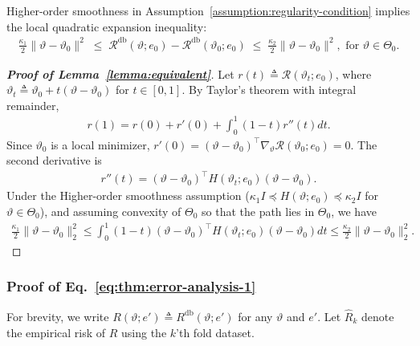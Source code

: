 \begin{lemma}\label{lemma:equivalent}
    \normalfont 
    Higher-order smoothness in Assumption~\ref{assumption:regularity-condition} implies the local quadratic expansion inequality: 
    \begin{align}\label{eq:local-quadratic}
        \frac{\kappa_1}{2}\|\vartheta-\vartheta_0\|^2  \;\le\; \mathcal R^{\mathrm{db}}(\vartheta;e_0)-\mathcal R^{\mathrm{db}}(\vartheta_0;e_0) \;\le\; \frac{\kappa_2}{2}\|\vartheta-\vartheta_0\|^2, \text{ for } \vartheta \in \varTheta_0.
    \end{align}
\end{lemma}
\begin{proof}[\textbf{Proof of Lemma~\ref{lemma:equivalent}}]
    Let $r(t) \triangleq \mathcal{R}(\vartheta_t; e_0)$, where $\vartheta_t \triangleq \vartheta_0 + t(\vartheta - \vartheta_0)$ for $t \in [0,1]$. By Taylor's theorem with integral remainder,
    \begin{align}
        r(1) = r(0) + r'(0) + \int_{0}^{1}(1-t) r''(t) dt.
    \end{align}
    Since $\vartheta_0$ is a local minimizer, $r'(0) = (\vartheta- \vartheta_0)^{\intercal}\nabla_{\vartheta}\mathcal{R}(\vartheta_0; e_0) = 0$. The second derivative is
    \begin{align}
        r''(t) = (\vartheta- \vartheta_0)^{\intercal} H(\vartheta_t; e_0) (\vartheta- \vartheta_0).
    \end{align}
    Under the Higher-order smoothness assumption ($\kappa_1 I \preceq H(\vartheta; e_0) \preceq \kappa_2 I$ for $\vartheta \in \varTheta_0$), and assuming convexity of $\varTheta_0$ so that the path lies in $\varTheta_0$, we have
    \begin{align}
       \frac{\kappa_1}{2} \|\vartheta - \vartheta_0 \|^2_2 \leq \int_{0}^{1}(1-t) (\vartheta - \vartheta_0)^{\intercal} H(\vartheta_t; e_0) (\vartheta- \vartheta_0) dt \leq \frac{\kappa_2}{2} \|\vartheta - \vartheta_0 \|^2_2.
    \end{align}
\end{proof}

\subsubsection*{Proof of Eq.~\eqref{eq:thm:error-analysis-1}}

For brevity, we write $R(\vartheta; e') \triangleq R^{\mathrm{db}}(\vartheta; e')$ for any $\vartheta$ and $e'$. Let $\widehat{R}_{k}$ denote the empirical risk of $R$ using the $k$'th fold dataset. 

